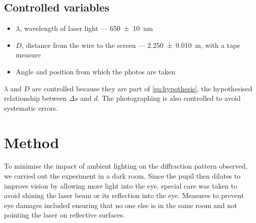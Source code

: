 \documentclass[a4paper, 12pt]{article}
\begin{document}
\subsection*{Controlled variables}
\begin{itemize}
\itemsep 0em
    \item $\lambda$, wavelength of laser light --- \SI{650+-10}{\nm} \autocite{laser-specs}
    \item $D$, distance from the wire to the screen --- \SI{2.250+-0.010}{\m}, with a tape measure
    \item Angle and position from which the photos are taken
\end{itemize}
$\lambda$ and $D$ are controlled because they are part of \cref{eq:hypothesis}, the hypothesised relationship between $\Delta s$ and $d$. 
The photographing is also controlled to avoid systematic errors.

\section{Method}
To minimise the impact of ambient lighting on the diffraction pattern observed, we carried out the experiment in a dark room. 
Since the pupil then dilates to improve vision by allowing more light into the eye, special care was taken to avoid shining the laser beam or its reflection into the eye. 
Measures to prevent eye damages included ensuring that no one else is in the same room and not pointing the laser on reflective surfaces.
\end{document}
